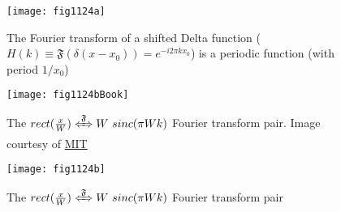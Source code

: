 \begin{figure}[H]
    \centering
    \texttt{[image: fig1124a]}
    \caption{The Fourier transform of a shifted Delta function ($H(k) \equiv \mathfrak{F}(\delta(x-x_0)) = e^{-i 2 \pi k x_0}$) is a periodic function (with period $1/x_0$)}
    \label{fig:fig1124a}
\end{figure}

\begin{figure}[H]
    \centering
    \texttt{[image: fig1124bBook]}
    \caption{The $rect(\frac{x}{W}) \xLeftrightarrow{\mathfrak{F}} W \ sinc(\pi Wk)$ Fourier transform pair. 
    Image courtesy of \href{https://ocw.mit.edu/resources/res-6-007-signals-and-systems-spring-2011/lecture-notes/MITRES_6_007S11_lec09.pdf}{MIT} }
    \label{fig:fig1124bBook}
\end{figure}

\begin{figure}[H]
    \centering
    \texttt{[image: fig1124b]}
    \caption{The $rect(\frac{x}{W}) \xLeftrightarrow{\mathfrak{F}} W \ sinc(\pi Wk)$ Fourier transform pair}
    \label{fig:fig1124b}
\end{figure}


%
